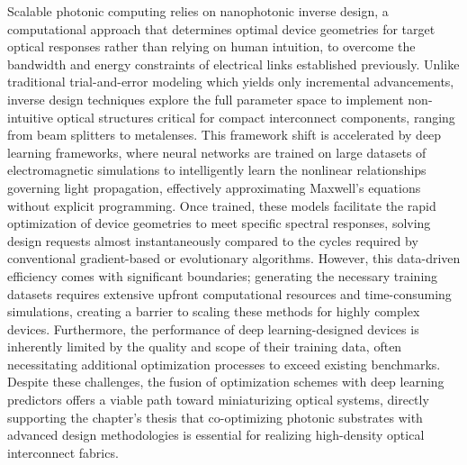 \documentclass[11pt]{article}
\begin{document}
Scalable photonic computing relies on nanophotonic inverse design, a computational approach that determines optimal device geometries for target optical responses rather than relying on human intuition, to overcome the bandwidth and energy constraints of electrical links established previously. \citep{doi_10_1002_lpor_202503115_6bf85dd2} \citep{doi_10_1039_d4nr03081h_5c44e89e} Unlike traditional trial-and-error modeling which yields only incremental advancements, inverse design techniques explore the full parameter space to implement non-intuitive optical structures critical for compact interconnect components, ranging from beam splitters to metalenses. This framework shift is accelerated by deep learning frameworks, where neural networks are trained on large datasets of electromagnetic simulations to intelligently learn the nonlinear relationships governing light propagation, effectively approximating Maxwell's equations without explicit programming. Once trained, these models facilitate the rapid optimization of device geometries to meet specific spectral responses, solving design requests almost instantaneously compared to the cycles required by conventional gradient-based or evolutionary algorithms. However, this data-driven efficiency comes with significant boundaries; generating the necessary training datasets requires extensive upfront computational resources and time-consuming simulations, creating a barrier to scaling these methods for highly complex devices. Furthermore, the performance of deep learning-designed devices is inherently limited by the quality and scope of their training data, often necessitating additional optimization processes to exceed existing benchmarks. Despite these challenges, the fusion of optimization schemes with deep learning predictors offers a viable path toward miniaturizing optical systems, directly supporting the chapter's thesis that co-optimizing photonic substrates with advanced design methodologies is essential for realizing high-density optical interconnect fabrics. \citep{doi_10_1515_nanoph_2021_0660_2d91a441} \citep{doi_10_1515_nanoph_2024_0536_4b6631ba} \citep{doi_10_1515_nanoph_2018_0183_d85e9193} \citep{doi_10_1515_nanoph_2019_0474_d2187501}
\end{document}
